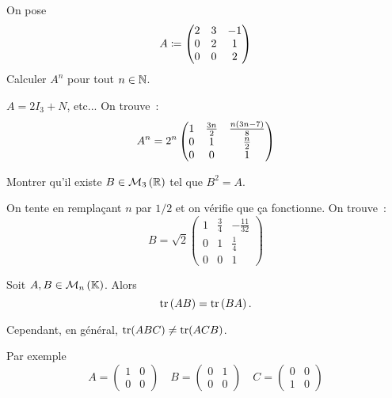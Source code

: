 \documentclass{magnolia}
\begin{document}
\begin{exos}
  \exo On pose
    \[A\coloneqq\begin{pmatrix}
        2 & 3 & -1\\
        0 & 2 & 1\\
        0 & 0 & 2
        \end{pmatrix}\]
    Calculer $A^n$ pour tout $n\in\mathbb{N}$.
    \begin{sol}
    $A=2I_3+N$, etc...
    On trouve~:
    \[A^n=2^n
    \begin{pmatrix}
      1 & \frac{3n}{2} & \frac{n\left(3n-7\right)}{8}\\
      0 & 1 & \frac{n}{2}\\
      0 & 0 & 1
      \end{pmatrix}\]
    \end{sol}
  \exo Montrer qu'il existe $B\in\mathcal{M}_{3}\left(\mathbb{R}\right)$ tel que $B^2=A$.
    \begin{sol}
    On tente en remplaçant $n$ par $1/2$ et on vérifie que ça fonctionne.
    On trouve~:
    \[B=\sqrt{2}
      \begin{pmatrix}
      1 & \frac{3}{4} & -\frac{11}{32}\\
      0 & 1 & \frac{1}{4}\\
      0 & 0 & 1
      \end{pmatrix}\]
    \end{sol}
  \end{exos}


  
  \begin{proposition}[utile=-3]
    Soit $A,B\in\mathcal{M}_{n}\left(\mathbb{K}\right)$. Alors
    \[\operatorname{tr}\left(AB\right)=\operatorname{tr}\left(BA\right).\]
    \end{proposition}
    
    \begin{remarqueUnique}
    \remarque Cependant, en général, $\operatorname{tr}(ABC)\neq\operatorname{tr}(ACB)$.
      \begin{sol}
      Par exemple
      \[A=
      \begin{pmatrix}
      1 & 0\\
      0 & 0
      \end{pmatrix} \quad B=
      \begin{pmatrix}
      0 & 1\\
      0 & 0
      \end{pmatrix} \quad C=
      \begin{pmatrix}
      0 & 0\\
      1 & 0
      \end{pmatrix}\]  
      \end{sol}
    \end{remarqueUnique}
    
\end{document}
